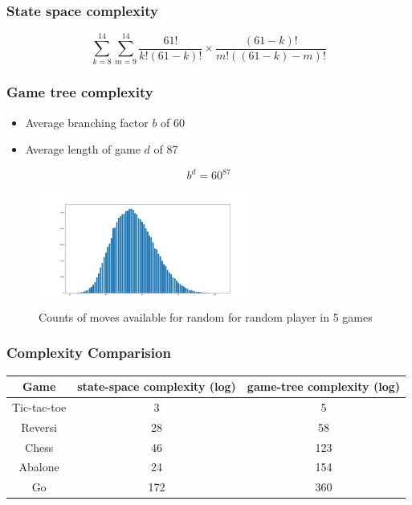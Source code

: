 \documentclass{beamer}
\begin{document}
\begin{frame}
	\frametitle{State space complexity}

	$$
		\sum_{k=8}^{14}\sum_{m=9}^{14}\frac{61!}{k!(61-k)!}\times\frac{(61-k)!}{m!((61-k)-m)!}
	$$
\end{frame}
\begin{frame}
	\frametitle{Game tree complexity}
	\begin{itemize}
		\item Average branching factor $b$ of 60
		\item Average length of game $d$ of 87 \cite{lemmens_constructing_2005}
	\end{itemize}
	$$ b^d = 60^{87}$$

	\begin{figure}
		\centering
		\includegraphics[width=7cm, keepaspectratio]{distribution_of_moves.png}
		\caption{Counts of moves available for random for random player in 5 games}
	\end{figure}
\end{frame}

\begin{frame}
	\frametitle{Complexity Comparision}
	\centering
	\begin{tabular}{ | c | c | c | }
		\hline
		Game        & \small{state-space complexity (log)} & \small{game-tree complexity} (log) \\
		\hline
		Tic-tac-toe & 3                                    & 5                                  \\
		\hline
		Reversi     & 28                                   & 58                                 \\
		\hline
		Chess       & 46                                   & 123                                \\
		\hline
		Abalone     & 24                                   & 154                                \\
		\hline
		Go          & 172                                  & 360                                \\
		\hline
	\end{tabular}
\end{frame}
\end{document}
